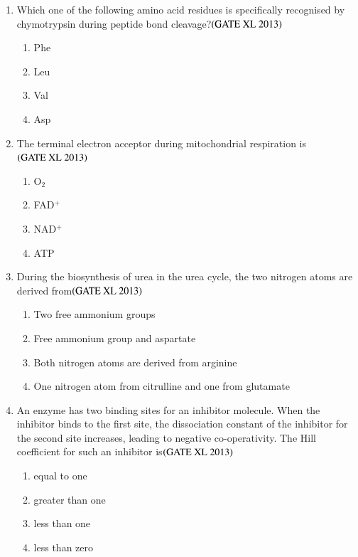 \documentclass[journal]{IEEEtran}
\begin{document}
\begin{enumerate}
\item Which one of the following amino acid residues is specifically recognised by chymotrypsin during peptide bond cleavage?\hfill $\left(\text{GATE XL 2013}\right)$
\begin{enumerate}
    \item Phe
    \item Leu
    \item Val
    \item Asp
\end{enumerate}

\item The terminal electron acceptor during mitochondrial respiration is\hfill $\left(\text{GATE XL 2013}\right)$
\begin{enumerate}
    \item O$_2$
    \item FAD$^+$
    \item NAD$^+$
    \item ATP
\end{enumerate}

\item During the biosynthesis of urea in the urea cycle, the two nitrogen atoms are derived from\hfill $\left(\text{GATE XL 2013}\right)$
\begin{enumerate}
    \item Two free ammonium groups
    \item Free ammonium group and aspartate
    \item Both nitrogen atoms are derived from arginine
    \item One nitrogen atom from citrulline and one from glutamate
\end{enumerate}

\item An enzyme has two binding sites for an inhibitor molecule. When the inhibitor binds to the first site, the dissociation constant of the inhibitor for the second site increases, leading to negative co-operativity. The Hill coefficient for such an inhibitor is\hfill $\left(\text{GATE XL 2013}\right)$
\begin{enumerate}
    \item equal to one
    \item greater than one
    \item less than one
    \item less than zero
\end{enumerate}


\end{enumerate}
\end{document}
